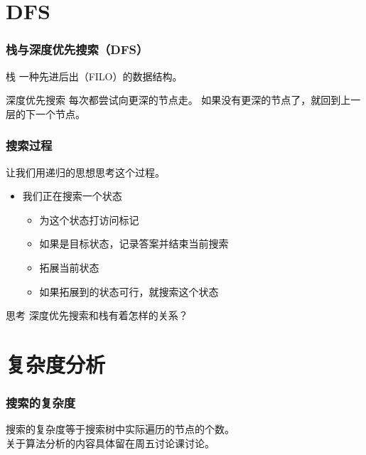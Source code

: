 \documentclass[11pt]{beamer}
\begin{document}
  \section{DFS}
  \begin{frame}[c]
  	\frametitle{栈与深度优先搜索（DFS）}
	  \begin{block}{栈}
      一种先进后出（FILO）的数据结构。
    \end{block}
    \begin{block}{深度优先搜索}
      每次都尝试向更深的节点走。 如果没有更深的节点了，就回到上一层的下一个节点。
    \end{block}
  \end{frame}

  \begin{frame}[c]
    \frametitle{搜索过程}
    让我们用递归的思想思考这个过程。
    \begin{itemize}
			\item 我们正在搜索一个状态
			\begin{itemize}
				\item 为这个状态打访问标记
				\item 如果是目标状态，记录答案并结束当前搜索
				\item 拓展当前状态
				\item 如果拓展到的状态可行，就搜索这个状态
		  \end{itemize}
		\end{itemize}
		\begin{block}{思考}
			深度优先搜索和栈有着怎样的关系？
		\end{block}
  \end{frame}

  \section{复杂度分析}
  \begin{frame}[c]
  	\frametitle{搜索的复杂度}
    搜索的复杂度等于搜索树中实际遍历的节点的个数。\\
    关于算法分析的内容具体留在周五讨论课讨论。
  \end{frame}
\end{document}
